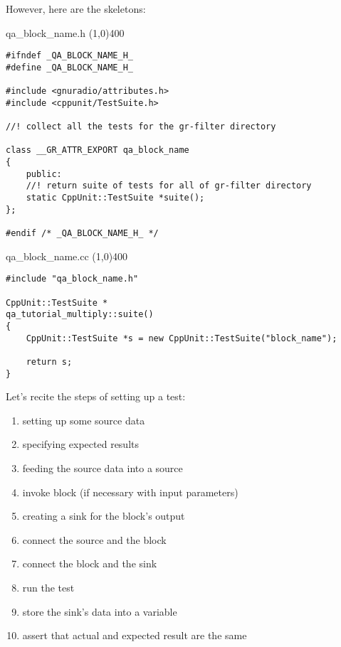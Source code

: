 \documentclass{article}
\begin{document}
\bigskip

However, here are the skeletons:

\begin{center}
	\vskip 0.1in
	qa\_block\_name.h
	\vskip -0.1in
	\line(1,0){400}
\end{center}

\begin{verbatim}
#ifndef _QA_BLOCK_NAME_H_
#define _QA_BLOCK_NAME_H_

#include <gnuradio/attributes.h>
#include <cppunit/TestSuite.h>

//! collect all the tests for the gr-filter directory

class __GR_ATTR_EXPORT qa_block_name
{
	public:
	//! return suite of tests for all of gr-filter directory
	static CppUnit::TestSuite *suite();
};

#endif /* _QA_BLOCK_NAME_H_ */
\end{verbatim}

\begin{center}
	\vskip 0.1in
	qa\_block\_name.cc
	\vskip -0.1in
	\line(1,0){400}
\end{center}

\begin{verbatim}
#include "qa_block_name.h"

CppUnit::TestSuite *
qa_tutorial_multiply::suite()
{
	CppUnit::TestSuite *s = new CppUnit::TestSuite("block_name");
	
	return s;
}
\end{verbatim} 

\bigskip

Let's recite the steps of setting up a test:

\begin{enumerate}
	\item setting up some source data 
	\item specifying expected results
	\item feeding the source data into a source
	\item invoke block (if necessary with input parameters)
	\item creating a sink for the block's output
	\item connect the source and the block
	\item connect the block and the sink
	\item run the test
	\item store the sink's data into a variable
	\item assert that actual and expected result are the same
\end{enumerate}
\end{document}

